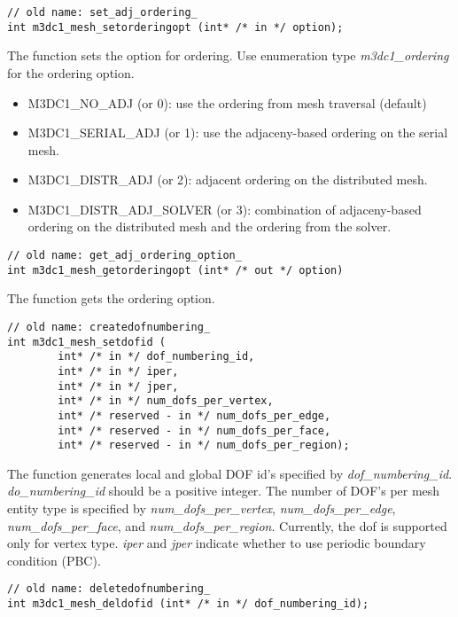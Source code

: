 \begin{verbatim}
// old name: set_adj_ordering_
int m3dc1_mesh_setorderingopt (int* /* in */ option);
\end{verbatim}\vspace{-.5cm}\hspace{1cm}

The function sets the option for ordering. Use enumeration type \emph{m3dc1\_ordering} for the ordering option.
\begin{itemize}
\item M3DC1\_NO\_ADJ (or 0): use the ordering from mesh traversal (default)
\item M3DC1\_SERIAL\_ADJ (or 1): use the adjaceny-based ordering on the serial mesh.
\item M3DC1\_DISTR\_ADJ (or 2): adjacent ordering on the distributed mesh.
\item M3DC1\_DISTR\_ADJ\_SOLVER (or 3): combination of adjaceny-based ordering on the distributed mesh and the ordering from the solver.
\end{itemize} 

\begin{verbatim}
// old name: get_adj_ordering_option_
int m3dc1_mesh_getorderingopt (int* /* out */ option)
\end{verbatim}\vspace{-.5cm}\hspace{1cm}

The function gets the ordering option. 

\begin{verbatim}
// old name: createdofnumbering_
int m3dc1_mesh_setdofid (
        int* /* in */ dof_numbering_id, 
        int* /* in */ iper, 
        int* /* in */ jper,
        int* /* in */ num_dofs_per_vertex, 
        int* /* reserved - in */ num_dofs_per_edge,
        int* /* reserved - in */ num_dofs_per_face, 
        int* /* reserved - in */ num_dofs_per_region); 
\end{verbatim}\vspace{-.5cm}\hspace{1cm}

The function generates local and global DOF id's specified by \textit{dof\_numbering\_id}. \textit{do\_numbering\_id} should be a positive integer. The number of DOF's per mesh entity type is specified by \textit{num\_dofs\_per\_vertex}, \textit{num\_dofs\_per\_edge}, \textit{num\_dofs\_per\_face}, and \textit{num\_dofs\_per\_region}. Currently, the dof is supported only for vertex type. \textit{iper} and \textit{jper} indicate whether to use periodic boundary condition (PBC).
\begin{verbatim}
// old name: deletedofnumbering_
int m3dc1_mesh_deldofid (int* /* in */ dof_numbering_id); 
\end{verbatim}\vspace{-.5cm}\hspace{1cm}

